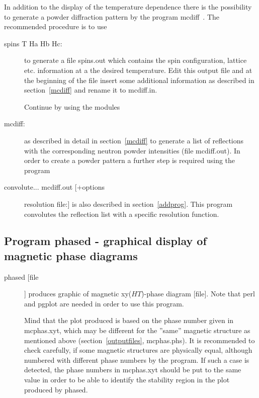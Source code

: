 In addition to the display of the temperature dependence there is the
possibility to generate a powder diffraction pattern by the 
program mcdiff~. The 
recommended procedure is to use 

\begin{description}
\item[{\prg spins} T Ha Hb Hc:] to generate a file {\prg spins.out} which
contains the spin configuration, lattice etc. information at a the
desired temperature. Edit this output file and at the beginning
of the file insert some additional information as described in section~\ref{mcdiff}
and rename it to {\prg mcdiff.in}.

Continue by using  the modules
\item[{\prg mcdiff}:] as described in detail in section~\ref{mcdiff} to
generate a list of reflections with the corresponding neutron powder
intensities (file {\prg mcdiff.out}). In order to create a powder pattern 
a further step is required using the program
\item[{\prg convolute}... mcdiff.out [+options] resolution file:]
  is also described in section~\ref{addprog}. This program convolutes the
reflection list with a specific resolution function.
\end{description}

\clearpage

\subsection{Program {\prg phased} - graphical display of magnetic phase diagrams}
\begin{description}
\item [phased    [file]]       produces graphic of magnetic xy($HT$)-phase diagram [file]. Note that
{\prg perl} and {\prg pgplot} are needed in order to use this program.

Mind that the plot produced is based on the phase number given in {\prg mcphas.xyt}, which may be
different for the ''same'' magnetic structure as mentioned above
(section~\ref{outputfiles}, {\prg mcphas.phs}). It is recommended to check carefully, if
some magnetic structures are physically equal, although numbered with different phase numbers by
the program. If such a case is detected, the phase numbers in {\prg mcphas.xyt} should
be put to the same value in order to be able to identify the stability region in the plot
produced by {\prg phased}.


\end{description}

